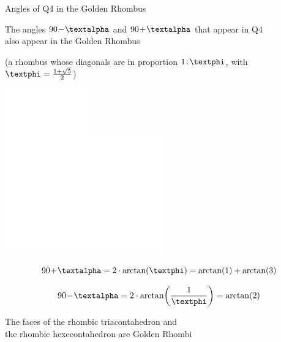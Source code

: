 \documentclass[14pt]{beamer}
\begin{document}

    \begin{frame}{Angles of Q4 in the Golden Rhombus}
        \begin{center}
            The angles $90\!-\!\text{\textalpha}$ and $90\!+\!\text{\textalpha}$ that appear in Q4\\also appear in the Golden Rhombus

            \medskip

            {\footnotesize(a rhombus whose diagonals are in proportion $1\!:\!\text{\textphi}$, with $\text{\textphi} =\tfrac{1+\sqrt{5}}{2}$)}

            \bigskip

            \begin{minipage}{16ex}\vspace{2ex}
                \includegraphics[height=15ex]{figures/figure007a.pdf}\includegraphics[height=15ex]{figures/figure007b.pdf}\\
            \end{minipage}\quad\begin{minipage}{25ex}
                \footnotesize
                $$90\!+\!\text{\textalpha} = 2\cdot\arctan{\!\left(\text{\textphi}\right)} = \arctan{\!\left(1\right)} + \arctan{\!\left(3\right)}$$

                $$90\!-\!\text{\textalpha} = 2\cdot\arctan{\!\left(\frac{1}{\text{\textphi}}\right)} = \arctan{\!\left(2\right)}$$

                \bigskip
            \end{minipage}

            {\footnotesize The faces of the rhombic triacontahedron and\\the rhombic hexecontahedron are Golden Rhombi}
        \end{center}
    \end{frame}
\end{document}
